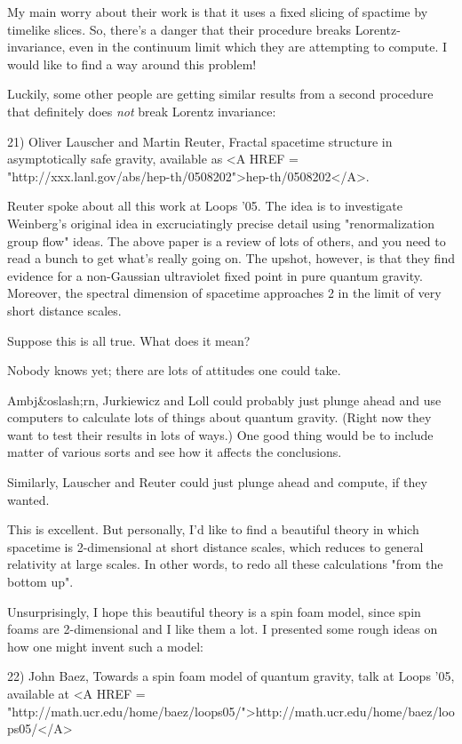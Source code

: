 My main worry about their work is that it uses a fixed slicing of
spactime by timelike slices.  So, there's a danger that their 
procedure breaks Lorentz-invariance, even in the continuum limit 
which they are attempting to compute.   I would like to find a way
around this problem!

Luckily, some other people are getting similar results from a second
procedure that definitely does \emph{not} break Lorentz invariance:

21) Oliver Lauscher and Martin Reuter, Fractal spacetime structure in 
asymptotically safe gravity, available as <A HREF = "http://xxx.lanl.gov/abs/hep-th/0508202">hep-th/0508202</A>.

Reuter spoke about all this work at Loops '05.  The idea is to 
investigate Weinberg's original idea in excruciatingly precise
detail using "renormalization group flow" ideas.  The above paper 
is a review of lots of others, and you need to read a bunch to get 
what's really going on.  The upshot, however, is that they find 
evidence for a non-Gaussian ultraviolet fixed point in pure quantum
gravity.  Moreover, the spectral dimension of spacetime approaches
2 in the limit of very short distance scales.  

Suppose this is all true.  What does it mean?

Nobody knows yet; there are lots of attitudes one could take.

Ambj&oslash;rn, Jurkiewicz and Loll could probably just plunge ahead and
use computers to calculate lots of things about quantum gravity.
(Right now they want to test their results in lots of ways.)  One
good thing would be to include matter of various sorts and see how
it affects the conclusions.

Similarly, Lauscher and Reuter could just plunge ahead and compute,
if they wanted.

This is excellent.  But personally, I'd like to find a beautiful theory
in which spacetime is 2-dimensional at short distance scales, which
reduces to general relativity at large scales.  In other words, to
redo all these calculations "from the bottom up".  

Unsurprisingly, I hope this beautiful theory is a spin foam model, 
since spin foams are 2-dimensional and I like them a lot.  I presented 
some rough ideas on how one might invent such a model:

22) John Baez, Towards a spin foam model of quantum gravity, 
talk at Loops '05, available at
<A HREF = "http://math.ucr.edu/home/baez/loops05/">http://math.ucr.edu/home/baez/loops05/</A>

